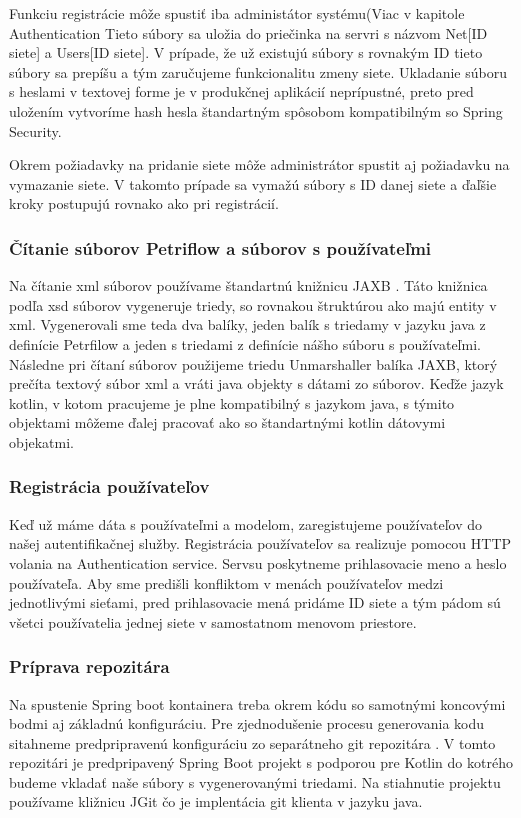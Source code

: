 Funkciu registrácie môže spustiť iba administátor systému(Viac v kapitole Authentication %
Tieto súbory sa uložia do priečinka na servri s názvom Net[ID siete] a Users[ID siete]. V prípade, že už existujú súbory s rovnakým ID tieto súbory sa prepíšu a tým zaručujeme funkcionalitu zmeny siete. 
Ukladanie súboru s heslami v textovej forme je v produkčnej aplikácií neprípustné, preto pred uložením vytvoríme hash hesla štandartným spôsobom kompatibilným so Spring Security.

Okrem požiadavky na pridanie siete môže administrátor spustit aj požiadavku na vymazanie siete. V takomto prípade sa vymažú súbory s ID danej siete a ďaľšie kroky postupujú rovnako ako pri registrácií.


\subsubsection{Čítanie súborov Petriflow a súborov s používateľmi}
Na čítanie \acrshort{xml} súborov používame štandartnú knižnicu JAXB \cite{jaxb}. Táto knižnica podľa \acrshort{xsd} súborov vygeneruje triedy, so rovnakou štruktúrou ako majú entity v \acrshort{xml}.
Vygenerovali sme teda dva balíky, jeden balík s triedamy v jazyku java z definície Petrfilow a jeden s triedami z definície nášho súboru s používateľmi. 
Následne pri čítaní súborov použijeme triedu Unmarshaller balíka JAXB, ktorý prečíta textový súbor \acrshort{xml} a vráti java objekty s dátami zo súborov. Keďže jazyk kotlin, v kotom pracujeme je plne kompatibilný s jazykom java, s týmito objektami môžeme ďalej pracovať ako so štandartnými kotlin dátovymi objekatmi.

\subsubsection{Registrácia používateľov}
Keď už máme dáta s používateľmi a modelom, zaregistujeme používateľov do našej autentifikačnej služby.
Registrácia používateľov sa realizuje pomocou HTTP volania na Authentication service. Servsu poskytneme prihlasovacie meno a heslo používateľa. Aby sme predišli konfliktom v menách používateľov medzi jednotlivými sieťami, pred prihlasovacie mená pridáme ID siete a tým pádom sú všetci používatelia jednej siete v samostatnom menovom priestore.

\subsubsection{Príprava repozitára}
Na spustenie Spring boot kontainera treba okrem kódu so samotnými koncovými bodmi aj základnú konfiguráciu. Pre zjednodušenie procesu generovania kodu sitahneme predpripravenú konfiguráciu zo separátneho git repozitára \cite{dp_relay}. V tomto repozitári je predpripavený Spring Boot projekt s podporou pre Kotlin do kotrého budeme vkladať naše súbory s vygenerovanými triedami. Na stiahnutie projektu používame kližnicu JGit \cite{jgit} čo je implentácia git klienta v jazyku java.

